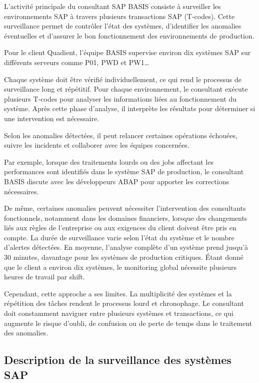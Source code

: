 L'activité principale du consultant SAP BASIS consiste à surveiller les environnements SAP à travers plusieurs transactions SAP (T-codes). Cette surveillance permet de contrôler l’état des systèmes, d'identifier les anomalies éventuelles et d'assurer le bon fonctionnement des environnements de production.

Pour le client Quadient, l'équipe BASIS supervise environ dix systèmes SAP sur différents serveurs comme P01, PWD et PW1…

Chaque système doit être vérifié individuellement, ce qui rend le processus de surveillance long et répétitif.
Pour chaque environnement, le consultant exécute plusieurs T-codes pour analyser les informations liées au fonctionnement du système. Après cette phase d’analyse, il interprète les résultats pour déterminer si une intervention est nécessaire.

Selon les anomalies détectées, il peut relancer certaines opérations échouées, suivre les incidents et collaborer avec les équipes concernées. 

Par exemple, lorsque des traitements lourds ou des jobs affectant les performances sont identifiés dans le système SAP de production, le consultant BASIS discute avec les développeurs ABAP pour apporter les corrections nécessaires.

De même, certaines anomalies peuvent nécessiter l’intervention des consultants fonctionnels, notamment dans les domaines financiers, lorsque des changements liés aux règles de l’entreprise ou aux exigences du client doivent être pris en compte.
La durée de surveillance varie selon l'état du système et le nombre d'alertes détectées. En moyenne, l'analyse complète d'un système prend jusqu'à 30 minutes, davantage pour les systèmes de production critiques. Étant donné que le client a environ dix systèmes, le monitoring global nécessite plusieurs heures de travail par shift.


Cependant, cette approche a ses limites. La multiplicité des systèmes et la répétition des tâches rendent le processus lourd et chronophage. Le consultant doit constamment naviguer entre plusieurs systèmes et transactions, ce qui augmente le risque d'oubli, de confusion ou de perte de temps dans le traitement des anomalies.


\subsection{Description de la surveillance des systèmes SAP}

